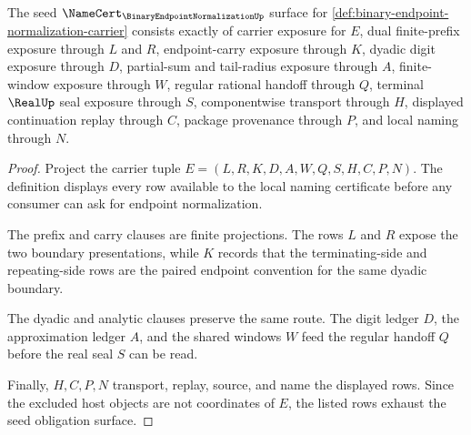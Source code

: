 \begin{theorem}
\label{thm:binary-endpoint-normalization-namecert-obligations}
The seed $\NameCert_{\BinaryEndpointNormalizationUp}$ surface for \autoref{def:binary-endpoint-normalization-carrier} consists exactly of carrier exposure for $E$, dual finite-prefix exposure through $L$ and $R$, endpoint-carry exposure through $K$, dyadic digit exposure through $D$, partial-sum and tail-radius exposure through $A$, finite-window exposure through $W$, regular rational handoff through $Q$, terminal $\RealUp$ seal exposure through $S$, componentwise transport through $H$, displayed continuation replay through $C$, package provenance through $P$, and local naming through $N$.
\end{theorem}
\begin{proof}
Project the carrier tuple $E=(L,R,K,D,A,W,Q,S,H,C,P,N)$. The definition displays every row available to the local naming certificate before any consumer can ask for endpoint normalization.

The prefix and carry clauses are finite projections. The rows $L$ and $R$ expose the two boundary presentations, while $K$ records that the terminating-side and repeating-side rows are the paired endpoint convention for the same dyadic boundary.

The dyadic and analytic clauses preserve the same route. The digit ledger $D$, the approximation ledger $A$, and the shared windows $W$ feed the regular handoff $Q$ before the real seal $S$ can be read.

Finally, $H,C,P,N$ transport, replay, source, and name the displayed rows. Since the excluded host objects are not coordinates of $E$, the listed rows exhaust the seed obligation surface.
\end{proof}

